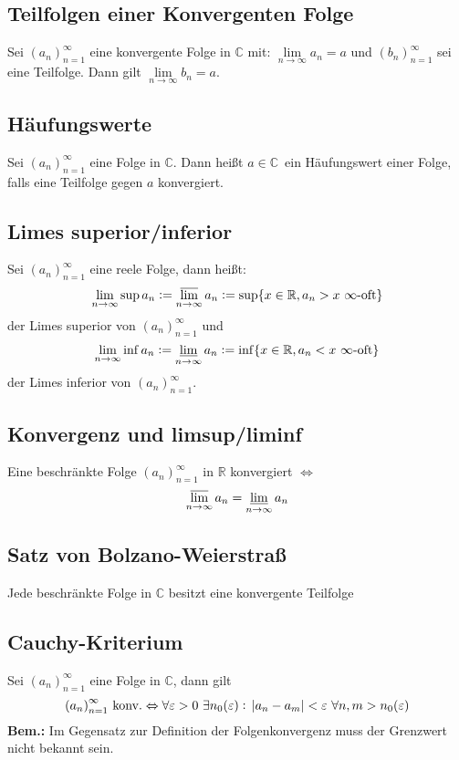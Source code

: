 \documentclass[10pt]{article}
\newcommand{\R}{\mathbb{R}}
\newcommand{\C}{\mathbb{C}}
\newcommand{\an}{{(a_n)}_{n=1}^\infty}
\begin{document}
    \subsection{Teilfolgen einer Konvergenten Folge}
    Sei $\an$ eine konvergente Folge in $\C$ mit:
    $\lim\limits_{n \rightarrow \infty} a_n = a$ und ${(b_n)}_{n=1}^\infty$
    sei eine Teilfolge. Dann gilt $\lim\limits_{n \rightarrow \infty} b_n = a$.

    \subsection{Häufungswerte} Sei $\an$ eine Folge in $\C$. Dann heißt
    $a \in\C$\ ein Häufungswert einer Folge, falls eine Teilfolge gegen $a$ konvergiert.

    \subsection{Limes superior/inferior}
    Sei $\an$ eine reele Folge, dann heißt:
    \begin{equation*}
        \lim_{n \rightarrow \infty} \sup a_n :=
        \varlimsup_{n \rightarrow \infty} a_n :=
        \sup \{ x \in \R, a_n > x\ \infty\text{-oft}\}
    \end{equation*}
    der Limes superior von $\an$ und
    \begin{equation*}
        \lim_{n \rightarrow \infty} \inf a_n :=
        \varliminf_{n \rightarrow \infty} a_n :=
        \inf \{ x \in \R, a_n < x\ \infty\text{-oft}\}
    \end{equation*}
    der Limes inferior von $\an$.

    \subsection{Konvergenz und limsup/liminf}
    Eine beschränkte Folge $\an$ in $\R$ konvergiert $\Leftrightarrow$
    \begin{equation*}
         \varlimsup_{n \rightarrow \infty} a_n
        = \varliminf_{n \rightarrow \infty} a_n
    \end{equation*}

    \subsection{Satz von Bolzano-Weierstraß}
    Jede beschränkte Folge in $\C$ besitzt eine konvergente Teilfolge

    \subsection{Cauchy-Kriterium}
    Sei $\an$ eine Folge in $\C$, dann gilt
    \begin{equation*}
        \an \text{ konv.} \Leftrightarrow
        \forall \varepsilon > 0\ \exists n_0(\varepsilon):\
        \abs{a_n - a_m} < \varepsilon\ \forall n,m > n_0(\varepsilon)
    \end{equation*}
    \textbf{Bem.:} Im Gegensatz zur Definition der Folgenkonvergenz muss der
    Grenzwert nicht bekannt sein.
\end{document}
